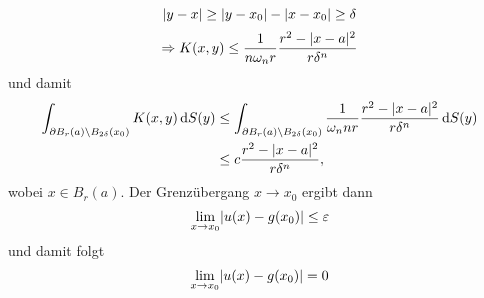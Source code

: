 \begin{beweis}
\begin{enumerate}[(i)]
\[				\lvert y-x\rvert \geq  \lvert y-x_0\rvert- \lvert x-x_0\rvert \geq \delta 
			\]
			\[
				\Rightarrow K(x,y) \leq \frac{1}{n \omega_n r} \frac{r^2 - \lvert x-a\rvert^2}{r \delta ^n}
			\]
			und damit 
			\begin{align*}
				\int_{\partial B_r(a) \setminus B_{2 \delta }(x_0)}^{} K(x,y) \,\mathrm{d}S(y) 
				&\leq \int_{\partial B_r(a) \setminus B_{2 \delta }(x_0)}^{} \frac{1}{\omega_n n r }\frac{ r^2 - \lvert x-a\rvert^2}{r \delta^n } \,\mathrm{d}S(y) \\
				&\leq c \frac{r^2 - \lvert x-a\rvert^2}{r \delta^n} ,
			\end{align*}
			wobei $x \in B_r(a)$. Der Grenzübergang $x \to x_0$ ergibt dann
			\[
				\lim_{x \to x_0} \lvert u(x)-g(x_0)\rvert \leq \varepsilon
			\]
			und damit folgt
			\[
				\lim_{x \to x_0} \lvert u(x)- g(x_0)\rvert = 0
			\]
		\end{enumerate}
	\end{beweis}